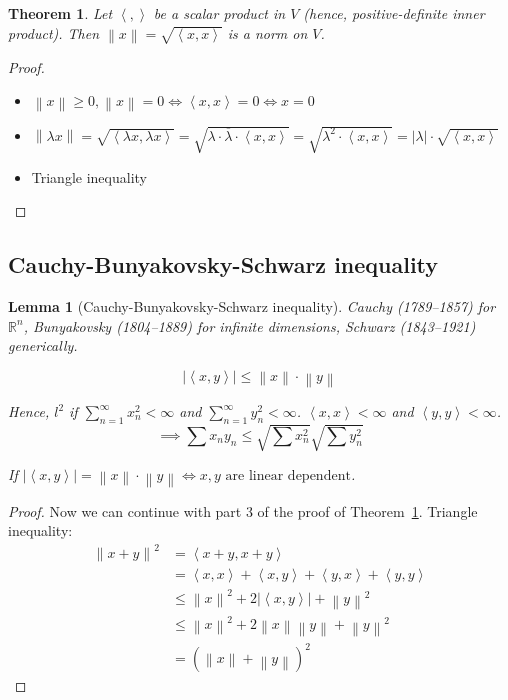 \documentclass{article}
\newtheorem{theorem}{Theorem}  \numberwithin{theorem}{section}
\newtheorem{lemma}{Lemma}  \numberwithin{lemma}{section}
\newcommand{\angel}[1]{\left\langle#1\right\rangle}
\newcommand{\norm}[1]{\left\|#1\right\|}
\newcommand{\card}[1]{\left|#1\right|}
\begin{document}
\begin{theorem} %
  \label{thm:t819}
  Let $\angel{,}$ be a scalar product in $V$ (hence, positive-definite inner product).
  Then $\norm{x} = \sqrt{\angel{x,x}}$ is a norm on $V$.
\end{theorem}

\begin{proof}
  \begin{itemize}
    \item $\norm{x} \geq 0, \norm{x} = 0 \iff \angel{x,x} = 0 \iff x = 0$
    \item $\norm{\lambda x} = \sqrt{\angel{\lambda x, \lambda x}} = \sqrt{\lambda \cdot \overline{\lambda} \cdot \angel{x,x}} = \sqrt{\lambda^2 \cdot \angel{x,x}} = \card{\lambda} \cdot \sqrt{\angel{x,x}}$
    \item Triangle inequality
  \end{itemize}
\end{proof}

\subsection{Cauchy-Bunyakovsky-Schwarz inequality}

\begin{lemma}[Cauchy-Bunyakovsky-Schwarz inequality] %
  \label{thm:cbs}
  Cauchy (1789--1857) for $\mathbb R^n$,
  Bunyakovsky (1804--1889) for infinite dimensions,
  Schwarz (1843--1921) generically.

  \[ \card{\angel{x,y}} \leq \norm{x} \cdot \norm{y} \]

  Hence, $l^2$ if $\sum_{n=1}^\infty x_n^2 < \infty$ and $\sum_{n=1}^\infty y_n^2 < \infty$.
  $\angel{x,x} < \infty$ and $\angel{y,y} < \infty$.
  \[ \implies \sum x_n y_n \leq \sqrt{\sum x_n^2} \sqrt{\sum y_n^2} \]

  If $\card{\angel{x,y}} = \norm{x} \cdot \norm{y} \iff x,y \text{ are linear dependent}$.
\end{lemma}

\begin{proof}
  Now we can continue with part 3 of the proof of Theorem~\ref{thm:t819}.
  Triangle inequality:
  \begin{align*}
    \norm{x + y}^2 &= \angel{x + y, x + y} \\
      &= \angel{x,x} + \angel{x,y} + \angel{y,x} + \angel{y,y} \\
      &\leq \norm{x}^2 + 2 \card{\angel{x, y}} + \norm{y}^2 \\
      &\leq \norm{x}^2 + 2 \norm{x} \norm{y} + \norm{y}^2 \\
      &= \left(\norm x + \norm y\right)^2
  \end{align*}
\end{proof}
\end{document}

